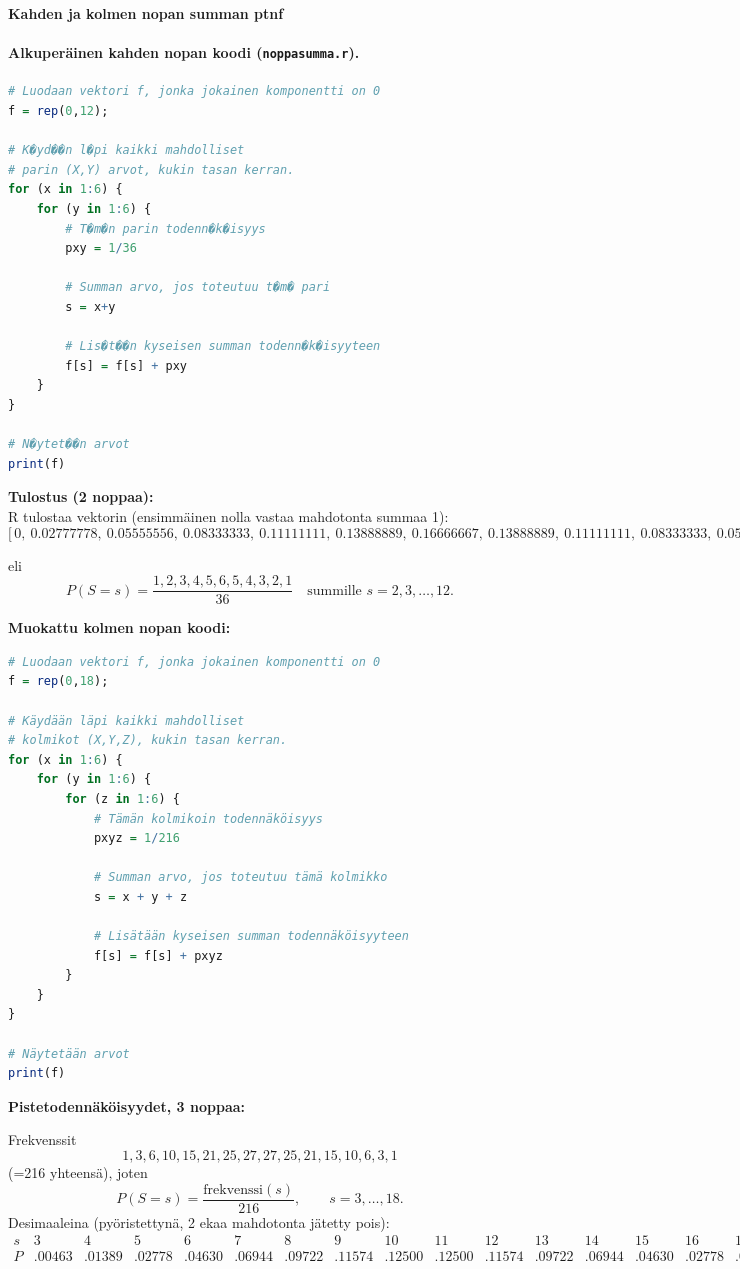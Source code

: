 \documentclass[12pt,a4paper]{article}
\begin{document}
\textbf{Kahden ja kolmen nopan summan ptnf}

\paragraph{Alkuperäinen kahden nopan koodi (\texttt{noppasumma.r}).}
\begin{lstlisting}[language=R]
# Luodaan vektori f, jonka jokainen komponentti on 0
f = rep(0,12);

# K�yd��n l�pi kaikki mahdolliset
# parin (X,Y) arvot, kukin tasan kerran.
for (x in 1:6) {
    for (y in 1:6) {
        # T�m�n parin todenn�k�isyys
        pxy = 1/36
        
        # Summan arvo, jos toteutuu t�m� pari
        s = x+y
        
        # Lis�t��n kyseisen summan todenn�k�isyyteen
        f[s] = f[s] + pxy
    }
}

# N�ytet��n arvot
print(f)
\end{lstlisting}

\textbf{Tulostus (2 noppaa):}\\
R tulostaa vektorin (ensimmäinen nolla vastaa mahdotonta summaa 1):
{\tiny
\[
\bigl[\,0,\ 0.02777778,\ 0.05555556,\ 0.08333333,\ 0.11111111,\ 0.13888889,\ 0.16666667,\ 0.13888889,\ 0.11111111,\ 0.08333333,\ 0.05555556,\ 0.02777778\,\bigr]
\]
}

eli
\[
P(S=s)=\frac{1,2,3,4,5,6,5,4,3,2,1}{36}\quad\text{summille }s=2,3,\dots,12.
\]
\pagebreak

\textbf{Muokattu kolmen nopan koodi:}
\begin{lstlisting}[language=R]
# Luodaan vektori f, jonka jokainen komponentti on 0
f = rep(0,18);

# Käydään läpi kaikki mahdolliset
# kolmikot (X,Y,Z), kukin tasan kerran.
for (x in 1:6) {
    for (y in 1:6) {
        for (z in 1:6) {
            # Tämän kolmikoin todennäköisyys
            pxyz = 1/216
            
            # Summan arvo, jos toteutuu tämä kolmikko
            s = x + y + z
            
            # Lisätään kyseisen summan todennäköisyyteen
            f[s] = f[s] + pxyz
        }
    }
}

# Näytetään arvot
print(f)
\end{lstlisting}

\textbf{Pistetodennäköisyydet, 3 noppaa:}

Frekvenssit
\[
1,3,6,10,15,21,25,27,27,25,21,15,10,6,3,1
\]
(=216 yhteensä), joten
\[
P(S=s)=\frac{\text{frekvenssi}(s)}{216},\qquad s=3,\dots,18.
\]
Desimaaleina (pyöristettynä, 2 ekaa mahdotonta jätetty pois):
{\tiny
\[
\begin{array}{c|cccccccccccccccc}
s&3&4&5&6&7&8&9&10&11&12&13&14&15&16&17&18\\\hline
P &.00463&.01389&.02778&.04630&.06944&.09722&.11574&.12500&.12500&.11574&.09722&.06944&.04630&.02778&.01389&.00463
\end{array}
\]
}
\end{document}
